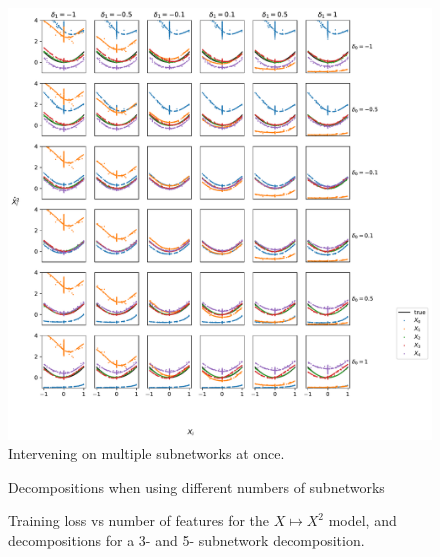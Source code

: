 \documentclass{article}
\theoremstyle{plain}
\theoremstyle{definition}
\theoremstyle{remark}
\begin{document}
\begin{figure}[ht]
    \centerline{\includegraphics[width=\textwidth]{../figures/s9_squared_intervention_multi_features.pdf}}
    \centering
    \caption{Intervening on multiple subnetworks at once.}\label{fig:s9_squared_intervention_multi_features}
\end{figure}

\begin{figure}[ht]
    \centering
    \caption{Decompositions when using different numbers of subnetworks}\label{fig:s10_squared_decompositions_features}
\end{figure}


\begin{figure}[ht]
    \centering
    \caption{Training loss vs number of features for the $X \mapsto X^2$ model, and decompositions for a 3- and 5- subnetwork decomposition.}\label{fig:s11_squared_features_vs_loss}
\end{figure}
\end{document}
